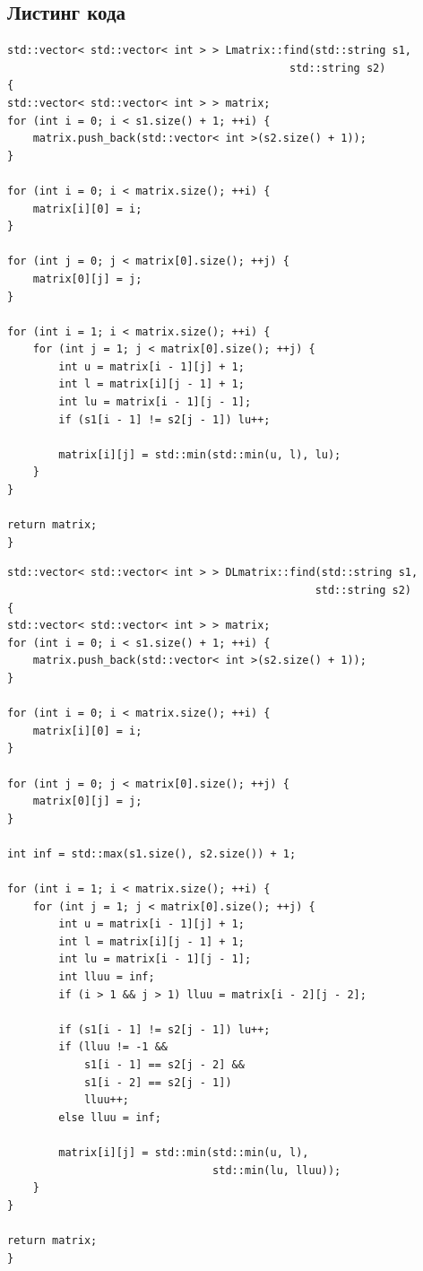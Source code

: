 \documentclass[a4paper,12pt]{article}
\begin{document}
\subsection{Листинг кода}

\begin{lstlisting}[caption=Расстояние Левенштейна матричный метод]
std::vector< std::vector< int > > Lmatrix::find(std::string s1,
                                            std::string s2)
{
std::vector< std::vector< int > > matrix;
for (int i = 0; i < s1.size() + 1; ++i) {
    matrix.push_back(std::vector< int >(s2.size() + 1));
}

for (int i = 0; i < matrix.size(); ++i) {
    matrix[i][0] = i;
}

for (int j = 0; j < matrix[0].size(); ++j) {
    matrix[0][j] = j;
}

for (int i = 1; i < matrix.size(); ++i) {
    for (int j = 1; j < matrix[0].size(); ++j) {
        int u = matrix[i - 1][j] + 1;
        int l = matrix[i][j - 1] + 1;
        int lu = matrix[i - 1][j - 1];
        if (s1[i - 1] != s2[j - 1]) lu++;

        matrix[i][j] = std::min(std::min(u, l), lu);
    }
}

return matrix;
}
\end{lstlisting}

\begin{lstlisting}[caption=Расстояние Дамерау-Левенштейна матричный метод]
std::vector< std::vector< int > > DLmatrix::find(std::string s1,
                                                std::string s2)
{
std::vector< std::vector< int > > matrix;
for (int i = 0; i < s1.size() + 1; ++i) {
    matrix.push_back(std::vector< int >(s2.size() + 1));
}

for (int i = 0; i < matrix.size(); ++i) {
    matrix[i][0] = i;
}

for (int j = 0; j < matrix[0].size(); ++j) {
    matrix[0][j] = j;
}

int inf = std::max(s1.size(), s2.size()) + 1;

for (int i = 1; i < matrix.size(); ++i) {
    for (int j = 1; j < matrix[0].size(); ++j) {
        int u = matrix[i - 1][j] + 1;
        int l = matrix[i][j - 1] + 1;
        int lu = matrix[i - 1][j - 1];
        int lluu = inf;
        if (i > 1 && j > 1) lluu = matrix[i - 2][j - 2];

        if (s1[i - 1] != s2[j - 1]) lu++;
        if (lluu != -1 &&
            s1[i - 1] == s2[j - 2] &&
            s1[i - 2] == s2[j - 1])
            lluu++;
        else lluu = inf;

        matrix[i][j] = std::min(std::min(u, l),
                                std::min(lu, lluu));
    }
}

return matrix;
}
\end{lstlisting}
\end{document}
